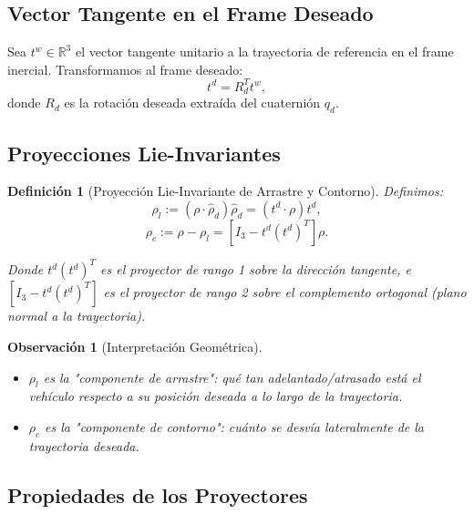 \documentclass[11pt,a4paper]{article}
\newtheorem{definition}[theorem]{Definición}
\newtheorem{remark}[theorem]{Observación}
\begin{document}
\subsection{Vector Tangente en el Frame Deseado}

Sea $t^w \in \mathbb{R}^3$ el vector tangente unitario a la trayectoria de referencia en el frame inercial. Transformamos al frame deseado:
\begin{equation}
    t^d = R_d^T t^w,
\end{equation}
donde $R_d$ es la rotación deseada extraída del cuaternión $q_d$.

\subsection{Proyecciones Lie-Invariantes}

\begin{definition}[Proyección Lie-Invariante de Arrastre y Contorno]
Definimos:
\begin{equation}
    \rho_l := (\rho \cdot \hat{\rho}_d) \hat{\rho}_d = (t^d \cdot \rho) t^d,
    \label{eq:rho_lag_projection}
\end{equation}
\begin{equation}
    \rho_c := \rho - \rho_l = \left[I_3 - t^d (t^d)^T\right] \rho.
    \label{eq:rho_contour_projection}
\end{equation}

Donde $t^d (t^d)^T$ es el proyector de rango 1 sobre la dirección tangente, e $[I_3 - t^d(t^d)^T]$ es el proyector de rango 2 sobre el complemento ortogonal (plano normal a la trayectoria).
\end{definition}

\begin{remark}[Interpretación Geométrica]
\begin{itemize}
    \item $\rho_l$ es la "componente de arrastre": qué tan adelantado/atrasado está el vehículo respecto a su posición deseada a lo largo de la trayectoria.
    \item $\rho_c$ es la "componente de contorno": cuánto se desvía lateralmente de la trayectoria deseada.
\end{itemize}
\end{remark}

\subsection{Propiedades de los Proyectores}
\end{document}
